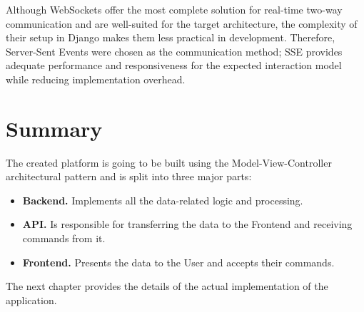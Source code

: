 Although WebSockets offer the most complete solution for real-time two-way communication and are well-suited
for the target architecture, the complexity of their setup in Django makes them less practical in development.
Therefore, Server-Sent Events were chosen as the communication method;
SSE provides adequate performance and responsiveness for the expected interaction model while reducing implementation overhead.


\section{Summary}

The created platform is going to be built using the Model-View-Controller \cite{mvc} architectural pattern
and is split into three major parts:
\begin{itemize}
    \item \textbf{Backend.} Implements all the data-related logic and processing.
    \item \textbf{API.} Is responsible for transferring the data to the Frontend and receiving commands from it.
    \item \textbf{Frontend.} Presents the data to the User and accepts their commands.
\end{itemize}

The next chapter  provides the details of the actual implementation of the application.